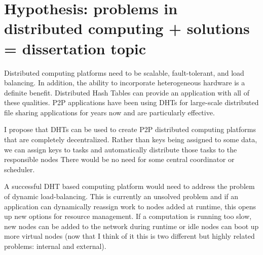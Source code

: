 \documentclass[10pt,letterpaper,twoside]{report}
\begin{document}


\section{Hypothesis:  problems in distributed computing + solutions =  dissertation topic}
Distributed computing platforms need to be scalable, fault-tolerant, and load balancing.
In addition, the ability to incorporate heterogeneous hardware is a definite benefit.
Distributed Hash Tables can provide an application with all of these qualities.
P2P applications have been using DHTs for large-scale distributed file sharing applications for years now and are particularly effective.


I propose that DHTs can be used to create P2P distributed computing platforms that are completely decentralized.
Rather than keys being assigned to some data, we can assign keys to tasks and automatically distribute those tasks to the responsible nodes
There would be no need for some central coordinator or scheduler.

A successful DHT based computing platform would need to address the problem of dynamic load-balancing.
This is currently an unsolved problem and if an application can dynamically reassign work to nodes added at runtime, this opens up new options for resource management.
If a computation  is running too slow, new nodes can be added to the network  during runtime or idle nodes can boot up more virtual nodes (now that I think of it this is two different but highly related problems: internal and external).
\end{document}
